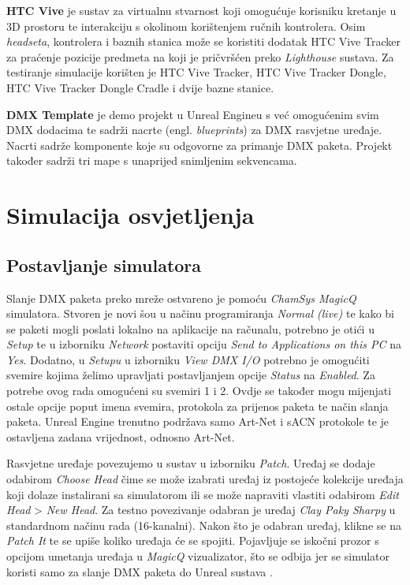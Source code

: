\documentclass[times, utf8, zavrsni, numeric]{fer}
\begin{document}
\textbf{HTC Vive} \cite{HTC_Vive} je sustav za virtualnu stvarnost koji omogućuje korisniku kretanje u 3D prostoru te interakciju s okolinom korištenjem ručnih kontrolera. Osim \emph{headseta}, kontrolera i baznih stanica može se koristiti dodatak HTC Vive Tracker za praćenje pozicije predmeta na koji je pričvršćen preko \emph{Lighthouse} sustava.
Za testiranje simulacije korišten je HTC Vive Tracker, HTC Vive Tracker Dongle, HTC Vive Tracker Dongle Cradle i dvije bazne stanice. \newline

\textbf{DMX Template} \cite{dmx_template} je demo projekt u Unreal Engineu s već omogućenim svim DMX dodacima te sadrži nacrte (engl. \emph{blueprints}) za DMX rasvjetne uređaje. Nacrti sadrže komponente koje su odgovorne za primanje DMX paketa. Projekt također sadrži tri mape s unaprijed snimljenim sekvencama.

\chapter{Simulacija osvjetljenja}

\section{Postavljanje simulatora}
Slanje DMX paketa preko mreže ostvareno je pomoću \emph{ChamSys MagicQ} simulatora. Stvoren je novi šou u načinu programiranja \emph{Normal (live)} te kako bi se paketi mogli poslati lokalno na aplikacije na računalu, potrebno je otići u \emph{Setup} te u izborniku \emph{Network} postaviti opciju \emph{Send to Applications on this PC} na \emph{Yes}. Dodatno, u \emph{Setupu} u izborniku \emph{View DMX I/O} potrebno je omogućiti svemire kojima želimo upravljati postavljanjem opcije \emph{Status} na \emph{Enabled}. Za potrebe ovog rada omogućeni su svemiri 1 i 2. Ovdje se također mogu mijenjati ostale opcije poput imena svemira, protokola za prijenos paketa te način slanja paketa. Unreal Engine trenutno podržava samo Art-Net i sACN protokole te je ostavljena zadana vrijednost, odnosno Art-Net. \newline

Rasvjetne uređaje povezujemo u sustav u izborniku \emph{Patch}. Uređaj se dodaje odabirom \emph{Choose Head} čime se može izabrati uređaj iz postojeće kolekcije uređaja koji dolaze instalirani sa simulatorom ili se može napraviti vlastiti odabirom \emph{Edit Head} > \emph{New Head}. Za testno povezivanje odabran je uređaj \emph{Clay Paky Sharpy} u standardnom načinu rada (16-kanalni). Nakon što je odabran uređaj, klikne se na \emph{Patch It} te se upiše koliko uređaja će se spojiti. Pojavljuje se iskočni prozor s opcijom umetanja uređaja u \emph{MagicQ} vizualizator, što se odbija jer se simulator koristi samo za slanje DMX paketa do Unreal sustava \cite{MagicQ_Manual}.
\end{document}
